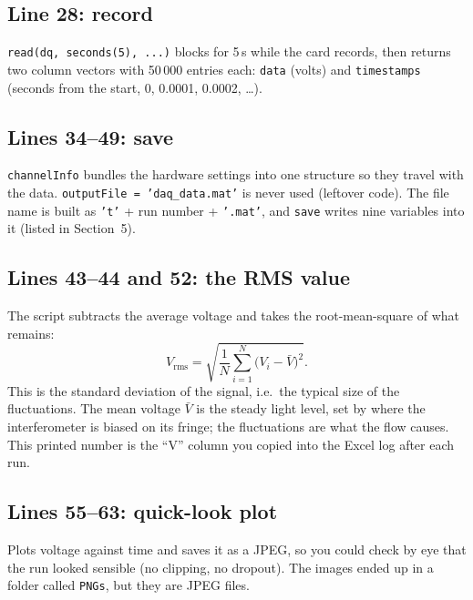 \documentclass[11pt,a4paper]{article}
\newcommand{\code}[1]{\texttt{#1}}
\begin{document}
\subsection*{Line 28: record}
\code{read(dq, seconds(5), ...)} blocks for 5\,s while the card records, then returns two column
vectors with 50\,000 entries each: \code{data} (volts) and \code{timestamps} (seconds from the
start, 0, 0.0001, 0.0002, \dots).

\subsection*{Lines 34--49: save}
\code{channelInfo} bundles the hardware settings into one structure so they travel with the data.
\code{outputFile = 'daq\_data.mat'} is never used (leftover code). The file name is built as
\code{'t'} + run number + \code{'.mat'}, and \code{save} writes nine variables into it (listed in
Section~5).

\subsection*{Lines 43--44 and 52: the RMS value}
The script subtracts the average voltage and takes the root-mean-square of what remains:
\[
V_{\mathrm{rms}} = \sqrt{\frac{1}{N}\sum_{i=1}^{N}\big(V_i-\bar V\big)^2}.
\]
This is the standard deviation of the signal, i.e.\ the typical size of the fluctuations. The mean
voltage $\bar V$ is the steady light level, set by where the interferometer is biased on its
fringe; the fluctuations are what the flow causes. This printed number is the ``V'' column you
copied into the Excel log after each run.

\subsection*{Lines 55--63: quick-look plot}
Plots voltage against time and saves it as a JPEG, so you could check by eye that the run looked
sensible (no clipping, no dropout). The images ended up in a folder called \code{PNGs}, but they
are JPEG files.
\end{document}
